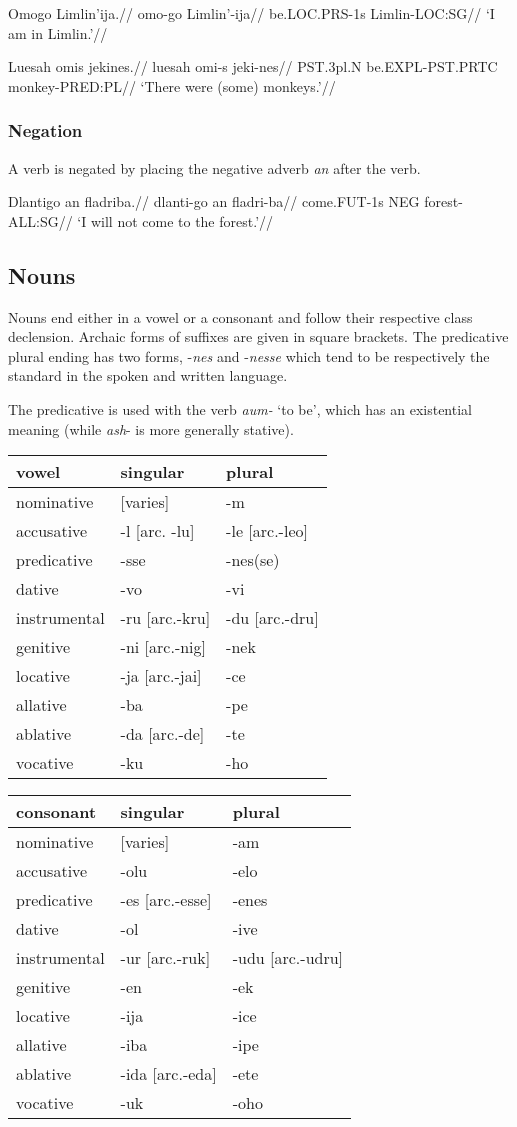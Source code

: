 \documentclass[a4paper,]{article}
\begin{document}
\ex \begingl \glpreamble Omogo Limlin'ija.// \gla omo-go Limlin'-ija//
\glb be.LOC.PRS-1s Limlin-LOC:SG// \glft `I am in Limlin.'// \endgl \xe

\ex \begingl \glpreamble Luesah omis jekines.// \gla luesah omi-s
jeki-nes// \glb PST.3pl.N be.EXPL-PST.PRTC monkey-PRED:PL// \glft `There
were (some) monkeys.'// \endgl \xe

\hypertarget{negation}{%
\subsubsection{Negation}\label{negation}}

A verb is negated by placing the negative adverb \emph{an} after the
verb.

\ex \begingl \glpreamble Dlantigo an fladriba.// \gla dlanti-go an
fladri-ba// \glb come.FUT-1s NEG forest-ALL:SG// \glft `I will not come
to the forest.'// \endgl \xe

\hypertarget{nouns}{%
\subsection{Nouns}\label{nouns}}

Nouns end either in a vowel or a consonant and follow their respective
class declension. Archaic forms of suffixes are given in square
brackets. The predicative plural ending has two forms, -\emph{nes} and
-\emph{nesse} which tend to be respectively the standard in the spoken
and written language.

The predicative is used with the verb \emph{aum-} `to be', which has an
existential meaning (while \emph{ash}- is more generally stative).

\begin{longtable}[]{@{}lll@{}}
\toprule
vowel & singular & plural\tabularnewline
\midrule
\endhead
nominative & {[}varies{]} & -m\tabularnewline
accusative & -l {[}arc. -lu{]} & -le {[}arc.-leo{]}\tabularnewline
predicative & -sse & -nes(se)\tabularnewline
dative & -vo & -vi\tabularnewline
instrumental & -ru {[}arc.-kru{]} & -du {[}arc.-dru{]}\tabularnewline
genitive & -ni {[}arc.-nig{]} & -nek\tabularnewline
locative & -ja {[}arc.-jai{]} & -ce\tabularnewline
allative & -ba & -pe\tabularnewline
ablative & -da {[}arc.-de{]} & -te\tabularnewline
vocative & -ku & -ho\tabularnewline
\bottomrule
\end{longtable}

\begin{longtable}[]{@{}lll@{}}
\toprule
consonant & singular & plural\tabularnewline
\midrule
\endhead
nominative & {[}varies{]} & -am\tabularnewline
accusative & -olu & -elo\tabularnewline
predicative & -es {[}arc.-esse{]} & -enes\tabularnewline
dative & -ol & -ive\tabularnewline
instrumental & -ur {[}arc.-ruk{]} & -udu {[}arc.-udru{]}\tabularnewline
genitive & -en & -ek\tabularnewline
locative & -ija & -ice\tabularnewline
allative & -iba & -ipe\tabularnewline
ablative & -ida {[}arc.-eda{]} & -ete\tabularnewline
vocative & -uk & -oho\tabularnewline
\bottomrule
\end{longtable}
\end{document}
